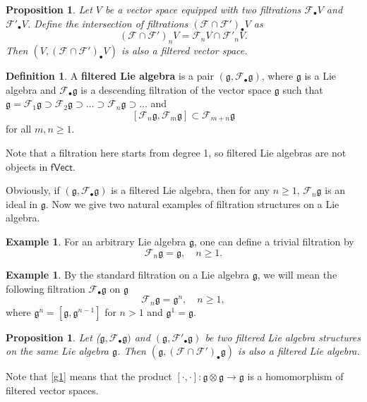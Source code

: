 \documentclass[12pt]{amsart}
\newtheorem{pro}[thm]{Proposition}
\theoremstyle{definition}   %
\newtheorem{defi}[thm]{Definition}
\newtheorem{ex}[thm]{Example}
\newcommand{\g}{\mathfrak g}
\newcommand{\huaF}{\mathcal{F}}
\newcommand{\fVec}{\mathsf{fVect}}
\begin{document}
\begin{pro}Let $V$ be a vector space equipped with two filtrations $\huaF_{\bullet}V$ and $\huaF'_{\bullet}V$. Define the intersection of filtrations $(\huaF\cap \huaF')_{\bullet}V$ as
$$
(\huaF\cap \huaF')_nV=\huaF_nV\cap \huaF'_nV.
$$
Then $(V, (\huaF\cap \huaF')_{\bullet}V)$ is also a filtered vector space.
\end{pro}




\begin{defi}\cite{Quillen}
   A {\bf filtered Lie algebra} is a pair $(\g, \huaF_{\bullet}\g)$, where $\g$ is a Lie algebra and $\huaF_{\bullet}\g$ is a descending filtration of the vector space $\g$ such that $\g=\huaF_1\g\supset \huaF_2\g\supset\ldots\supset \huaF_n\g\supset\ldots$ and
   \begin{equation}\label{g1}
   [\huaF_n\g,\huaF_m\g]\subset \huaF_{m+n}\g
   \end{equation}
   for all $m,n\geq 1$.
\end{defi}
Note that a filtration here starts from degree 1,
so filtered Lie algebras are not objects in $\fVec$.

Obviously, if $(\g,\huaF_{\bullet}\g)$ is a filtered Lie algebra, then for any $n\geq 1$, $\huaF_n\g$ is an ideal in $\g$. Now we give two natural examples of filtration structures on a Lie algebra.

\begin{ex}\label{trivial-fil}
For an arbitrary Lie algebra $\g$, one can define a trivial filtration by
$$
\huaF_n\g=\g,\quad n\geq 1.
$$
    \end{ex}



\begin{ex}\label{filtrst}
 By the standard filtration on a Lie algebra $\g$, we will mean the following filtration $\huaF_{\bullet}\g$ on $\g$
$$
\huaF_n\g=\g^n,\quad n\geq 1,
$$
where $\g^n=[\g,\g^{n-1}]$ for $n>1$ and $\g^1=\g$.
\end{ex}

\begin{pro}
    Let ($\g,\huaF_{\bullet}\g)$ and $(\g,\huaF'_{\bullet}\g)$ be two  filtered Lie algebra structures on the same Lie algebra $\g$. Then $(\g,(\huaF\cap \huaF')_{\bullet}\g)$ is also a filtered Lie algebra.
\end{pro}

Note that \eqref{g1} means that the product $[\cdot,\cdot]:\g\otimes \g\longrightarrow \g$ is a homomorphism of filtered vector spaces.
\end{document}
